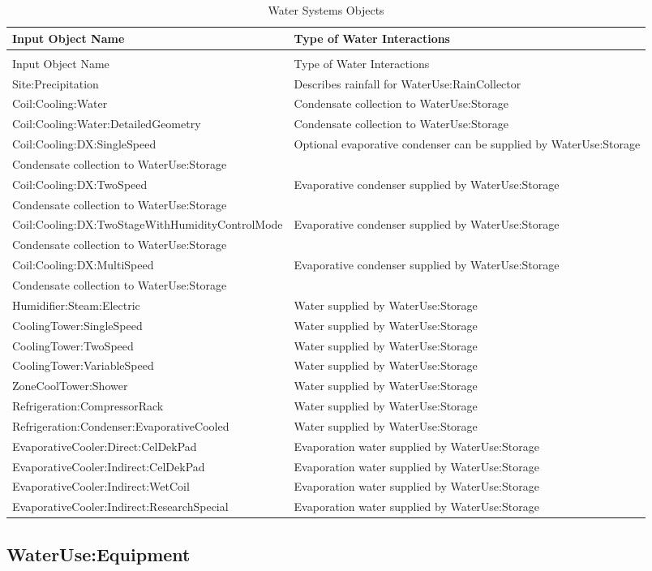 \begin{longtable}[c]{p{3.5in}p{3.5in}}
\caption{Water Systems Objects \label{table:water-systems-objects}} \tabularnewline
\toprule
Input Object Name & Type of Water Interactions \tabularnewline
\midrule
\endfirsthead

\caption[]{Water Systems Objects} \tabularnewline
\toprule
Input Object Name & Type of Water Interactions \tabularnewline
\midrule
\endhead

Site:Precipitation & Describes rainfall for WaterUse:RainCollector \tabularnewline
Coil:Cooling:Water & Condensate collection to WaterUse:Storage \tabularnewline
Coil:Cooling:Water:DetailedGeometry & Condensate collection to WaterUse:Storage \tabularnewline
Coil:Cooling:DX:SingleSpeed & Optional evaporative condenser can be supplied by WaterUse:Storage \tabularnewline
Condensate collection to WaterUse:Storage \tabularnewline
Coil:Cooling:DX:TwoSpeed & Evaporative condenser supplied by WaterUse:Storage \tabularnewline
Condensate collection to WaterUse:Storage \tabularnewline
Coil:Cooling:DX:TwoStageWithHumidityControlMode & Evaporative condenser supplied by WaterUse:Storage \tabularnewline
Condensate collection to WaterUse:Storage \tabularnewline
Coil:Cooling:DX:MultiSpeed & Evaporative condenser supplied by WaterUse:Storage \tabularnewline
Condensate collection to WaterUse:Storage \tabularnewline
Humidifier:Steam:Electric & Water supplied by WaterUse:Storage \tabularnewline
CoolingTower:SingleSpeed & Water supplied by WaterUse:Storage \tabularnewline
CoolingTower:TwoSpeed & Water supplied by WaterUse:Storage \tabularnewline
CoolingTower:VariableSpeed & Water supplied by WaterUse:Storage \tabularnewline
ZoneCoolTower:Shower & Water supplied by WaterUse:Storage \tabularnewline
Refrigeration:CompressorRack & Water supplied by WaterUse:Storage \tabularnewline
Refrigeration:Condenser:EvaporativeCooled & Water supplied by WaterUse:Storage \tabularnewline
EvaporativeCooler:Direct:CelDekPad & Evaporation water supplied by WaterUse:Storage \tabularnewline
EvaporativeCooler:Indirect:CelDekPad & Evaporation water supplied by WaterUse:Storage \tabularnewline
EvaporativeCooler:Indirect:WetCoil & Evaporation water supplied by WaterUse:Storage \tabularnewline
EvaporativeCooler:Indirect:ResearchSpecial & Evaporation water supplied by WaterUse:Storage \tabularnewline
\bottomrule
\end{longtable}

\subsection{WaterUse:Equipment}\label{wateruseequipment}

